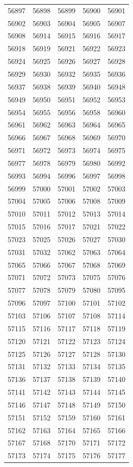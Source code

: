 \documentclass[12pt,a4paper]{amsbook}
\theoremstyle{definition}
\begin{document}
\begin{longtable}{|c|c|c|c|c|}
56897&56898&56899&56900&56901\\ 
56902&56903&56904&56905&56907\\ 
56908&56914&56915&56916&56917\\ 
56918&56919&56921&56922&56923\\ 
56924&56925&56926&56927&56928\\ 
56929&56930&56932&56935&56936\\ 
56937&56938&56939&56940&56948\\ 
56949&56950&56951&56952&56953\\ 
56954&56955&56956&56958&56960\\ 
56961&56962&56963&56964&56965\\ 
56966&56967&56968&56969&56970\\ 
56971&56972&56973&56974&56975\\ 
56977&56978&56979&56980&56992\\ 
56993&56994&56996&56997&56998\\ 
56999&57000&57001&57002&57003\\ 
57004&57005&57006&57008&57009\\ 
57010&57011&57012&57013&57014\\ 
57015&57016&57017&57021&57022\\ 
57023&57025&57026&57027&57030\\ 
57031&57032&57062&57063&57064\\ 
57065&57066&57067&57068&57069\\ 
57071&57072&57073&57075&57076\\ 
57077&57078&57079&57080&57095\\ 
57096&57097&57100&57101&57102\\ 
57103&57106&57107&57108&57114\\ 
57115&57116&57117&57118&57119\\ 
57120&57121&57122&57123&57124\\ 
57125&57126&57127&57128&57130\\ 
57131&57132&57133&57134&57135\\ 
57136&57137&57138&57139&57140\\ 
57141&57142&57143&57144&57145\\ 
57146&57147&57148&57149&57150\\ 
57151&57152&57159&57160&57161\\ 
57162&57163&57164&57165&57166\\ 
57167&57168&57170&57171&57172\\ 
57173&57174&57175&57176&57177\\ 

\end{longtable}
\end{document}
